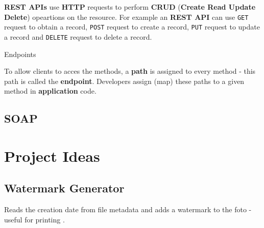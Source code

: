 \textbf{REST APIs} use \textbf{HTTP} requests to perform \textbf{CRUD} (\textbf{Create Read Update Delete}) opeartions on the resource. For example an \textbf{REST API} can use \texttt{GET} request to obtain a record, \texttt{POST} request to create a record, \texttt{PUT} request to update a record and \texttt{DELETE} request to delete a record.

Endpoints

To allow clients to acces the methods, a \textbf{path} is assigned to every method - this path is called the \textbf{endpoint}. Developers assign (map) these paths to a given method in \textbf{application} code.

\section{SOAP}

\chapter{Project Ideas}

\section{Watermark Generator}

Reads the creation date from file metadata and adds a watermark to the foto - useful for printing .